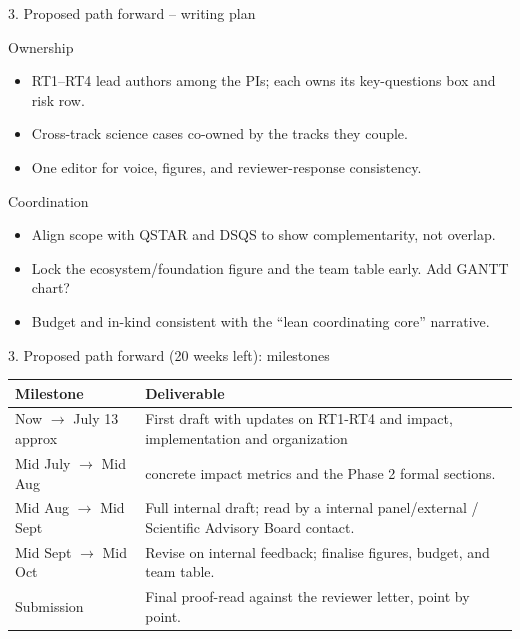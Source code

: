 \documentclass[10pt,aspectratio=169]{beamer}
\begin{document}
\begin{frame}{3. Proposed path forward -- writing plan}
  \begin{block}{Ownership}
    \begin{itemize}\small
      \item RT1--RT4 lead authors among the PIs; each owns its key-questions box and risk row.
      \item Cross-track science cases co-owned by the tracks they couple.
      \item One editor for voice, figures, and reviewer-response consistency.
    \end{itemize}
  \end{block}
  \begin{block}{Coordination}
    \begin{itemize}\small
      \item Align scope with QSTAR and DSQS to show complementarity, not overlap.
      \item Lock the ecosystem/foundation figure and the team table early. Add GANTT chart?
      \item Budget and in-kind consistent with the ``lean coordinating core'' narrative.
    \end{itemize}
  \end{block}
\end{frame}

\begin{frame}{3. Proposed path forward (20 weeks left): milestones}
  \footnotesize
  \renewcommand{\arraystretch}{1.3}
  \begin{tabular}{@{}p{2.6cm}p{9.6cm}@{}}
    \toprule
    \textbf{Milestone} & \textbf{Deliverable}\\
    \midrule
    Now $\rightarrow$ July 13 approx  & First draft with updates on RT1-RT4 and impact, implementation and organization \\
    Mid July $\rightarrow$ Mid Aug & concrete impact metrics and the Phase 2 formal sections. \\
    Mid Aug $\rightarrow$ Mid Sept  & Full internal draft; read by a internal panel/external / Scientific Advisory Board contact.\\
    Mid Sept $\rightarrow$ Mid Oct & Revise on internal feedback; finalise figures, budget, and team table.\\
    Submission & Final proof-read against the reviewer letter, point by point.\\
    \bottomrule
  \end{tabular}
\end{frame}
\end{document}
